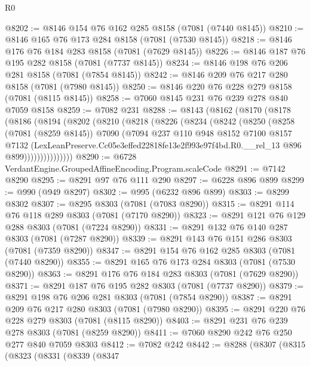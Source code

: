\begin{lexlean}{R0}
\begin{coremodule}
@8202 := @8146 @154 @76 @162 @285 @8158 (@7081 (@7440 @8145))
@8210 := @8146 @165 @76 @173 @284 @8158 (@7081 (@7530 @8145))
@8218 := @8146 @176 @76 @184 @283 @8158 (@7081 (@7629 @8145))
@8226 := @8146 @187 @76 @195 @282 @8158 (@7081 (@7737 @8145))
@8234 := @8146 @198 @76 @206 @281 @8158 (@7081 (@7854 @8145))
@8242 := @8146 @209 @76 @217 @280 @8158 (@7081 (@7980 @8145))
@8250 := @8146 @220 @76 @228 @279 @8158 (@7081 (@8115 @8145))
@8258 := @7060 @8145 @231 @76 @239 @278 @840 @7059 @8158
@8259 := @7082 @231
@8288 := @8143
    (@8162
      (@8170
        (@8178
          (@8186
            (@8194
              (@8202
                (@8210
                  (@8218
                    (@8226
                      (@8234
                        (@8242
                          (@8250
                            (@8258
                              (@7081 (@8259 @8145))
                              @7090
                              (@7094
                                @237
                                @110
                                @948
                                @8152
                                @7100
                                @8157
                                @7132
                                (LexLeanPreserve.Cc05e3effed22818fe13e2f993e97f4bd.R0.__rel_13
                                  @896
                                  @899)))))))))))))))
@8290 := @6728 VerdantEngine.GroupedAffineEncoding.Program.scaleCode
@8291 := @7142 @8290
@8295 := @8291 @97 @76 @111 @290
@8297 := @6228 @896 @899
@8299 := @990 (@949 @8297)
@8302 := @995 (@6232 @896 @899)
@8303 := @8299 @8302
@8307 := @8295 @8303 (@7081 (@7083 @8290))
@8315 := @8291 @114 @76 @118 @289 @8303 (@7081 (@7170 @8290))
@8323 := @8291 @121 @76 @129 @288 @8303 (@7081 (@7224 @8290))
@8331 := @8291 @132 @76 @140 @287 @8303 (@7081 (@7287 @8290))
@8339 := @8291 @143 @76 @151 @286 @8303 (@7081 (@7359 @8290))
@8347 := @8291 @154 @76 @162 @285 @8303 (@7081 (@7440 @8290))
@8355 := @8291 @165 @76 @173 @284 @8303 (@7081 (@7530 @8290))
@8363 := @8291 @176 @76 @184 @283 @8303 (@7081 (@7629 @8290))
@8371 := @8291 @187 @76 @195 @282 @8303 (@7081 (@7737 @8290))
@8379 := @8291 @198 @76 @206 @281 @8303 (@7081 (@7854 @8290))
@8387 := @8291 @209 @76 @217 @280 @8303 (@7081 (@7980 @8290))
@8395 := @8291 @220 @76 @228 @279 @8303 (@7081 (@8115 @8290))
@8403 := @8291 @231 @76 @239 @278 @8303 (@7081 (@8259 @8290))
@8411 := @7060 @8290 @242 @76 @250 @277 @840 @7059 @8303
@8412 := @7082 @242
@8442 := @8288
    (@8307
      (@8315
        (@8323
          (@8331
            (@8339
              (@8347

\end{coremodule}
\end{lexlean}
